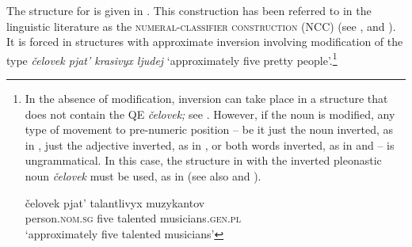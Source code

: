 \documentclass[output=paper,
modfonts,
newtxmath,
hidelinks
]{langscibook}
\begin{document}
\noindent The structure for  is given in . This construction has been referred to in the linguistic literature as the \textsc{numeral-classifier construction} (NCC) (see \citealt{Sussex1976}, \citealt{Yadroff1999} and \citealt{Pesetsky2013}). It is forced in structures with approximate inversion involving modification of the type \textit{čelovek pjat’ krasivyx ljudej} `approximately five pretty people'.\footnote{\label{18:fn11}In the absence of modification, inversion can take place in a structure that does not contain the QE \textit{čelovek;} see . However, if the noun is modified, any type of movement to pre-numeric position -- be it just the noun inverted, as in , just the adjective inverted, as in , or both words inverted, as in  and  -- is ungrammatical. In this case, the structure in  with the inverted pleonastic noun \textit{čelovek} must be used, as in  (see also \citealt{Melčuk1985} and \citealt{Yadroff1999}).%
\begin{multicols}{2}
\ea \label{18:fn11i}
	\label{18:fn11ia}\columnbreak
    \label{18:fn11ib}
    \z
\z
\end{multicols}

\begin{multicols}{2}
\ea \label{18:fn11ii}
	\columnbreak
    \label{18:fn11iib}
    \label{18:fn11iic}
    \label{18:fn11iid}
    \label{18:fn11iie}
    \z
\z
\end{multicols}
\ea \label{18:fn11iii}
    \gll čelovek    pjat’  talantlivyx  muzykantov\\
    	 person.\textsc{nom.sg}   five  talented    musicians.\textsc{gen.pl}\\
         \glt `approximately five talented musicians'
\z 
}
\end{document}
